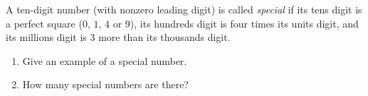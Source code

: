A ten-digit number (with nonzero leading digit) is called \emph{special} if its tens digit is a perfect square ($0$, $1$, $4$ or $9$), its hundreds digit is four times its units digit, and its millions digit is $3$ more than its thousands digit.
\begin{enumerate}
\item[(a)] Give an example of a special number.
\item[(b)] How many special numbers are there?
\end{enumerate}
